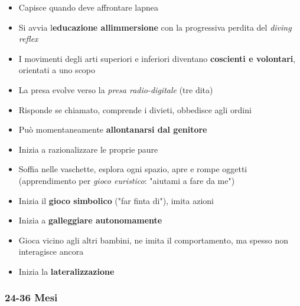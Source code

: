 \documentclass[a4paper,11pt]{article}
\providecommand{\tightlist}{%
  \setlength{\itemsep}{0pt}\setlength{\parskip}{0pt}}
\begin{document}
\begin{itemize}
      \tightlist
      \item
            Capisce quando deve affrontare l\textquotesingle apnea
      \item
            Si avvia l\textquotesingle{}\textbf{educazione
                  all\textquotesingle immersione} con la progressiva perdita del
            \emph{diving reflex}
      \item
            I movimenti degli arti superiori e inferiori diventano
            \textbf{coscienti e volontari}, orientati a uno scopo
      \item
            La presa evolve verso la \emph{presa radio-digitale} (tre dita)
      \item
            Risponde se chiamato, comprende i divieti, obbedisce agli ordini
      \item
            Può momentaneamente \textbf{allontanarsi dal genitore}
      \item
            Inizia a razionalizzare le proprie paure
      \item
            Soffia nelle vaschette, esplora ogni spazio, apre e rompe oggetti
            (apprendimento per \emph{gioco euristico}: "aiutami a fare da me")
      \item
            Inizia il \textbf{gioco simbolico} ("far finta di"), imita azioni
      \item
            Inizia a \textbf{galleggiare autonomamente}
      \item
            Gioca vicino agli altri bambini, ne imita il comportamento, ma spesso
            non interagisce ancora
      \item
            Inizia la \textbf{lateralizzazione}
\end{itemize}

\subsubsection{24-36 Mesi}\label{mesi-2}
\end{document}
